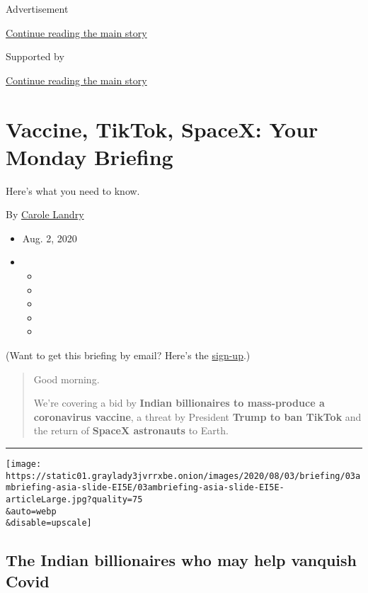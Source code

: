 Advertisement

\protect\hyperlink{after-top}{Continue reading the main story}

Supported by

\protect\hyperlink{after-sponsor}{Continue reading the main story}

\hypertarget{vaccine-tiktok-spacex-your-monday-briefing}{%
\section{Vaccine, TikTok, SpaceX: Your Monday
Briefing}\label{vaccine-tiktok-spacex-your-monday-briefing}}

Here's what you need to know.

By \href{https://www.nytimes3xbfgragh.onion/by/carole-landry}{Carole
Landry}

\begin{itemize}
\item
  Aug. 2, 2020
\item
  \begin{itemize}
  \item
  \item
  \item
  \item
  \item
  \end{itemize}
\end{itemize}

(Want to get this briefing by email? Here's the
\href{https://www.nytimes3xbfgragh.onion/morning-briefing}{sign-up}.)

\begin{quote}
Good morning.

We're covering a bid by \textbf{Indian billionaires to mass-produce a
coronavirus vaccine}, a threat by President \textbf{Trump to ban TikTok}
and the return of \textbf{SpaceX astronauts} to Earth.
\end{quote}

\begin{center}\rule{0.5\linewidth}{\linethickness}\end{center}

\texttt{[image: https://static01.graylady3jvrrxbe.onion/images/2020/08/03/briefing/03ambriefing-asia-slide-EI5E/03ambriefing-asia-slide-EI5E-articleLarge.jpg?quality=75\\\&auto=webp\\\&disable=upscale]}

\hypertarget{the-indian-billionaires-who-may-help-vanquish-covid}{%
\subsection{The Indian billionaires who may help vanquish
Covid}\label{the-indian-billionaires-who-may-help-vanquish-covid}}

